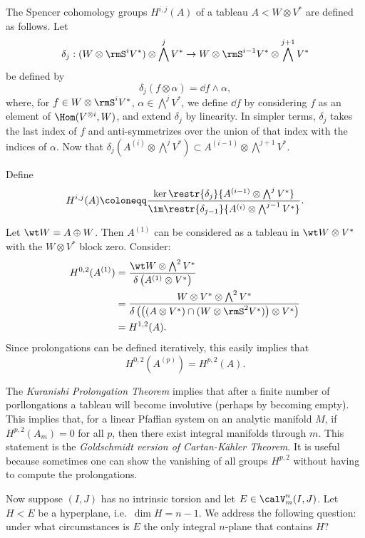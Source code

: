 \begin{defn}
    The Spencer cohomology groups $H^{i,j}(A)$ of a tableau $A<W\otimes V^\ast$ are defined as follows. Let 
    \[\delta_j:(W\otimes \rmS^iV^\ast)\otimes \bigwedge^j V^\ast\to W\otimes \rmS^{i-1}V^\ast\otimes \bigwedge^{j+1}V^\ast\]
    be defined by 
    \[\delta_j(f\otimes \alpha)=\dd f\wedge \alpha,\]
    where, for $f\in W\otimes \rmS^i V^\ast$, $\alpha\in \bigwedge^j V^\ast$, we define $\dd f$ by considering $f$ as an element of $\Hom(V^{\otimes i},W)$, and extend $\delta_j$ by linearity. In simpler terms, $\delta_j$ takes the last index of $f$ and anti-symmetrizes over the union of that index with the indices of $\alpha$. Now that $\delta_j(A^{(i)}\otimes \bigwedge^j V^\ast)\subset A^{(i-1)}\otimes\bigwedge^{j+1}V^\ast$.

    Define 
    \[H^{i,j}(A)\coloneqq \frac{\ker\restr{\delta_j}{A^{(i-1)}\otimes \bigwedge^jV^\ast}}{\im \restr{\delta_{j-1}}{A^{(i)}\otimes \bigwedge^{j-1}V^\ast}}.\]
\end{defn}

Let $\wt W=A\oplus W$. Then $A^{(1)}$ can be considered as a tableau in $\wt W\otimes V^\ast$ with the $W\otimes V^\ast$ block zero. Consider:
\begin{align}
    H^{0,2}(A^{(1)})&= \frac{\wt W\otimes \bigwedge^2 V^\ast}{\delta\left(A^{(1)}\otimes V^\ast\right)}\\
    &= \frac{W\otimes V^\ast\otimes \bigwedge^2 V^\ast}{\delta\left(\left((A\otimes V^\ast)\cap (W\otimes \rmS^2 V^\ast)\right)\otimes V^\ast\right)}\\
    &=H^{1,2}(A).
\end{align}
Since prolongations can be defined iteratively, this easily implies that 
\[H^{0,2}(A^{(p)})=H^{p,2}(A).\]

\begin{rem}
    The \emph{Kuranishi Prolongation Theorem} implies that after a finite number of porllongations a tableau will become involutive (perhaps by becoming empty). This implies that, for a linear Pfaffian system on an analytic manifold $M$, if $H^{p,2}(A_m)=0$ for all $p$, then there exist integral manifolds through $m$. This statement is the \emph{Goldschmidt version of Cartan-K\"ahler Theorem}. It is useful because sometimes one can show the vanishing of all groups $H^{p,2}$ without having to compute the prolongations.
\end{rem}

Now suppose $(I,J)$ has no intrinsic torsion and let $E\in\calV^n_m(I,J)$. Let $H<E$ be a hyperplane, i.e.\ $\dim H=n-1$. We address the following question: under what circumstances is $E$ the only integral $n$-plane that contains $H$?

